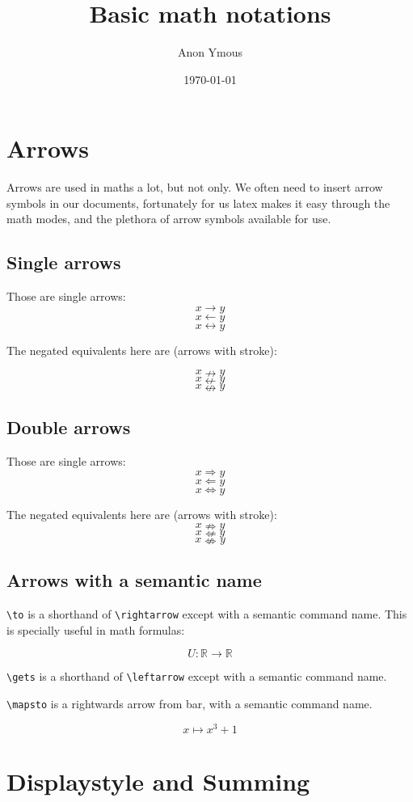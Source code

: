 \documentclass[a4paper]{article}
\author{Anon Ymous}
\date{\today}
\title{Basic math notations}
\begin{document}
\maketitle
\tableofcontents

\section{Arrows}

Arrows are used in maths a lot, but not only. We often need to insert arrow
symbols in our documents, fortunately for us latex makes it easy through the
math modes, and the plethora of arrow symbols available for use.

\subsection{Single arrows}

Those are single arrows:
$$x \rightarrow y$$
$$x \leftarrow y$$
$$x \leftrightarrow y$$


The negated equivalents here are (arrows with stroke):

$$x \nrightarrow y$$
$$x \nleftarrow y$$
$$x \nleftrightarrow y$$

\subsection{Double arrows}

Those are single arrows:
$$x \Rightarrow y$$
$$x \Leftarrow y$$
$$x \Leftrightarrow y$$


The negated equivalents here are (arrows with stroke):
$$x \nRightarrow y$$
$$x \nLeftarrow y$$
$$x \nLeftrightarrow y$$

\subsection{Arrows with a semantic name}

\verb`\to` is a shorthand of \verb`\rightarrow` except with a semantic command
name. This is specially useful in math formulas:

$$U:\mathbb R \to \mathbb R$$

\verb`\gets` is a shorthand of \verb`\leftarrow` except with a semantic command
name.

\verb`\mapsto` is a rightwards arrow from bar, with a semantic command name.

$$x \mapsto x^3 + 1$$


\section{Displaystyle and Summing}
\end{document}
